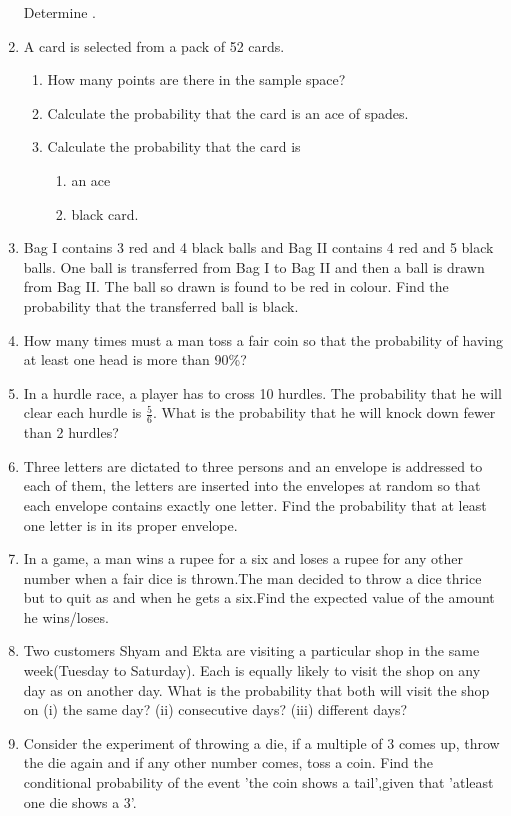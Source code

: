 \begin{enumerate}[label=\thechapter.\arabic*,ref=\thechapter.\theenumi]
\begin{enumerate}
\end{enumerate}
Determine .
\item A card is selected from a pack of 52 cards.
\begin{enumerate}
\item How many points are there in the sample space?
\item Calculate the probability that the card is an ace of spades.
\item Calculate the probability that the card is 
           \begin{enumerate}
           \item an ace
           \item black card.
           \end{enumerate}
\end{enumerate}
\item Bag I contains 3 red and 4 black balls and Bag II contains 4 red and 5 black balls.
One ball is transferred from Bag I to Bag II and then a ball is drawn from Bag II.
The ball so drawn is found to be red in colour. Find the probability that the
transferred ball is black.
\item How many times must a man toss a fair coin so that the probability of having
at least one head is more than 90\%?
\item In a hurdle race, a player has to cross 10 hurdles. The probability that he will clear each hurdle is $\frac{5}{6}$. What is the probability that he will knock down fewer than 2 hurdles?
\item Three letters are dictated to three persons and an envelope is addressed to each
of them, the letters are inserted into the envelopes at random so that each envelope
contains exactly one letter. Find the probability that at least one letter is in its
proper envelope.
\item In a game, a man wins a rupee for a six and loses a rupee for any other number when a fair dice is thrown.The man decided to throw a dice thrice but to quit as and when he gets a six.Find the expected value of the amount he wins/loses.
\item Two customers Shyam and Ekta are visiting a particular shop in the same week(Tuesday to Saturday). Each is equally likely to visit the shop on any day as on another day. What is the probability that both will visit the shop on (i) the same day? (ii) consecutive days? (iii) different days?
\item Consider the experiment of throwing a die, if a multiple of 3 comes up, throw the die again and if any other number comes, toss a coin. Find the conditional probability of the event 'the coin shows a tail',given that 'atleast one die shows a 3'.

\end{enumerate}
